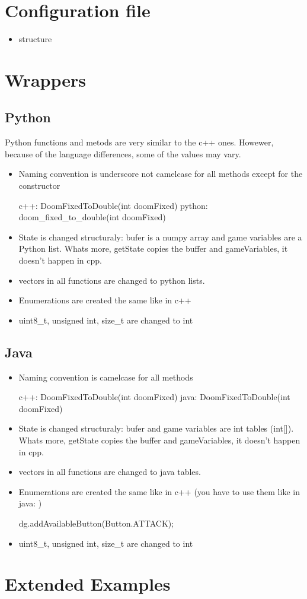 \section{Configuration file}\label{sec:configuration_file}
\begin{itemize}
\item structure
\end{itemize}

\section{Wrappers}
\subsection{Python}
Python functions and metods are very similar to the c++ ones. Howewer, because of the language differences, some of the values may vary.
\begin{itemize}
\item Naming convention is underscore not camelcase for all methods except for the constructor
\begin{clinee}
c++: DoomFixedToDouble(int doomFixed)
python: doom\_fixed\_to\_double(int doomFixed)
\end{clinee}
\item State is changed structuraly: bufer is a numpy array and game variables are a Python list. Whats more, getState copies the buffer and gameVariables, it doesn't happen in cpp. 
\item vectors in all functions  are changed to python lists.
\item Enumerations are created the same like in c++
\item uint8\_t, unsigned int, size\_t are changed to int
\end{itemize}
\subsection{Java}
\begin{itemize}
\item Naming convention is camelcase for all methods
\begin{clinee}
c++: DoomFixedToDouble(int doomFixed)
java: DoomFixedToDouble(int doomFixed)
\end{clinee}
\item State is changed structuraly: bufer and game variables are int tables (int[]). Whats more, getState copies the buffer and gameVariables, it doesn't happen in cpp. 
\item vectors in all functions  are changed to java tables.
\item Enumerations are created the same like in c++ (you have to use them like in java: )
\begin{clinee}
 dg.addAvailableButton(Button.ATTACK);
\end{clinee}
\item uint8\_t, unsigned int, size\_t are changed to int
\end{itemize}
\section{Extended Examples}
